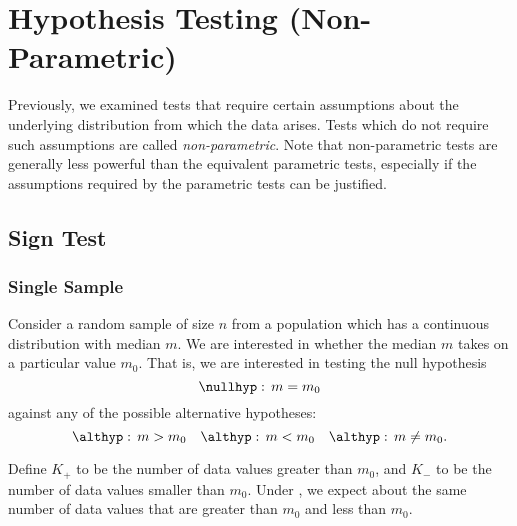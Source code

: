 \chapter{Hypothesis Testing (Non-Parametric)}

Previously, we examined tests that require certain assumptions about the underlying distribution from which the data arises. Tests which do not require such assumptions are called \emph{non-parametric}. Note that non-parametric tests are generally less powerful than the equivalent parametric tests, especially if the assumptions required by the parametric tests can be justified.

\section{Sign Test}

\subsection{Single Sample}

Consider a random sample of size $n$ from a population which has a continuous distribution with median $m$. We are interested in whether the median $m$ takes on a particular value $m_0$. That is, we are interested in testing the null hypothesis \[\nullhyp: \, m = m_0\] against any of the possible alternative hypotheses: \[\althyp: \, m > m_0 \quad \althyp: \, m < m_0 \quad \althyp: \, m \neq m_0.\]

Define $K_+$ to be the number of data values greater than $m_0$, and $K_-$ to be the number of data values smaller than $m_0$. Under \nullhyp, we expect about the same number of data values that are greater than $m_0$ and less than $m_0$.

\begin{center}
\end{center}

